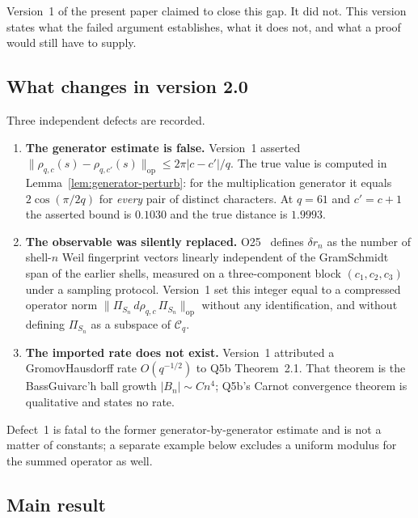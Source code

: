 \documentclass[12pt,a4paper]{article}
\theoremstyle{definition}
\theoremstyle{remark}
\newcommand{\Cq}{\mathcal{C}_q}
\newcommand{\rhoc}{\rho_{q,c}}
\begin{document}
      Version~1 of the present paper claimed to close this gap.
      It did not.
      This version states what the failed argument establishes, what it does not, and what a
      proof would still have to supply.

    \subsection{What changes in version 2.0}

      Three independent defects are recorded.

      \begin{enumerate}
        \item \textbf{The generator estimate is false.}
        Version~1 asserted
        $\|\rho_{q,c}(s) - \rho_{q,c'}(s)\|_{\mathrm{op}} \leq 2\pi|c-c'|/q$.
        The true value is computed in Lemma~\ref{lem:generator-perturb}: for the
        multiplication generator it equals $2\cos(\pi/2q)$ for \emph{every} pair of distinct
        characters. At $q = 61$ and $c' = c+1$ the asserted bound is $0.1030$ and the true
        distance is $1.9993$.
        \item \textbf{The observable was silently replaced.}
        O25~\cite{Beau2026a29} defines $\delta r_n$ as the number of shell-$n$ Weil
        fingerprint vectors linearly independent of the Gram\textendash Schmidt span of the
        earlier shells, measured on a three-component block $(c_1,c_2,c_3)$ under a sampling
        protocol. Version~1 set this integer equal to a compressed operator norm
        $\|\Pi_{S_n}\,d\rhoc\,\Pi_{S_n}\|_{\mathrm{op}}$ without any identification, and
        without defining $\Pi_{S_n}$ as a subspace of $\Cq$.
        \item \textbf{The imported rate does not exist.}
        Version~1 attributed a Gromov\textendash Hausdorff rate $O(q^{-1/2})$ to Q5b
        Theorem~2.1. That theorem is the Bass\textendash Guivarc'h ball growth
        $|B_n| \sim Cn^4$; Q5b's Carnot convergence theorem is qualitative and states no rate.
      \end{enumerate}

      Defect~1 is fatal to the former generator-by-generator estimate and is not a matter
      of constants; a separate example below excludes a uniform modulus for the summed
      operator as well.

    \subsection{Main result}
\end{document}

